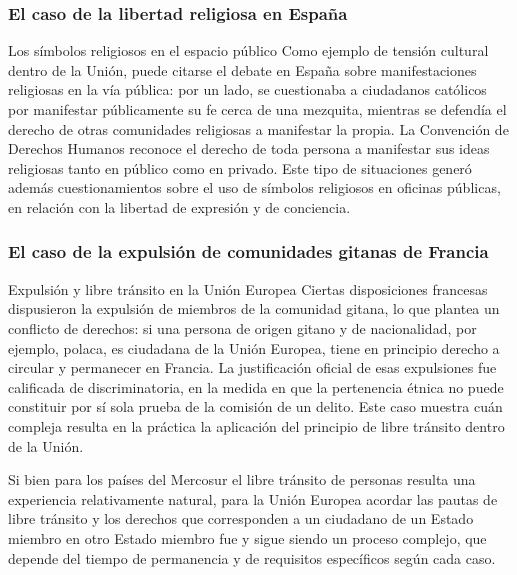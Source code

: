 \documentclass[12pt,oneside]{book}
\begin{document}
\subsubsection{El caso de la libertad religiosa en España}

\begin{example}{Los símbolos religiosos en el espacio público}
Como ejemplo de tensión cultural dentro de la Unión, puede citarse el debate en España sobre manifestaciones religiosas en la vía pública: por un lado, se cuestionaba a ciudadanos católicos por manifestar públicamente su fe cerca de una mezquita, mientras se defendía el derecho de otras comunidades religiosas a manifestar la propia. La Convención de Derechos Humanos reconoce el derecho de toda persona a manifestar sus ideas religiosas tanto en público como en privado. Este tipo de situaciones generó además cuestionamientos sobre el uso de símbolos religiosos en oficinas públicas, en relación con la libertad de expresión y de conciencia.
\end{example}

\subsubsection{El caso de la expulsión de comunidades gitanas de Francia}

\begin{example}{Expulsión y libre tránsito en la Unión Europea}
Ciertas disposiciones francesas dispusieron la expulsión de miembros de la comunidad gitana, lo que plantea un conflicto de derechos: si una persona de origen gitano y de nacionalidad, por ejemplo, polaca, es ciudadana de la Unión Europea, tiene en principio derecho a circular y permanecer en Francia. La justificación oficial de esas expulsiones fue calificada de discriminatoria, en la medida en que la pertenencia étnica no puede constituir por sí sola prueba de la comisión de un delito. Este caso muestra cuán compleja resulta en la práctica la aplicación del principio de libre tránsito dentro de la Unión.
\end{example}

Si bien para los países del Mercosur el libre tránsito de personas resulta una experiencia relativamente natural, para la Unión Europea acordar las pautas de libre tránsito y los derechos que corresponden a un ciudadano de un Estado miembro en otro Estado miembro fue y sigue siendo un proceso complejo, que depende del tiempo de permanencia y de requisitos específicos según cada caso.
\end{document}
